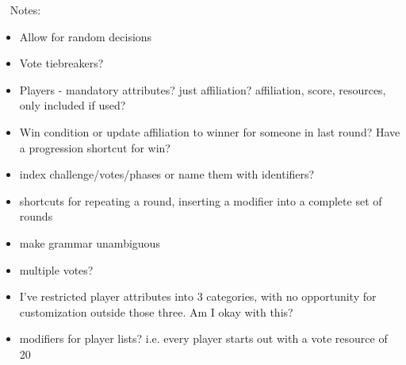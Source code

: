 \documentclass{article}
\begin{document}
~\newline
Notes:
\begin{itemize}
	\item Allow for random decisions
	\item Vote tiebreakers?
	\item Players - mandatory attributes? just affiliation? affiliation, score, 
	resources, only included if used?
	\item Win condition or update affiliation to winner for someone in last 
	round? Have a progression shortcut for win?
	\item index challenge/votes/phases or name them with identifiers?
	\item shortcuts for repeating a round, inserting a modifier into a complete 
	set of rounds
	\item make grammar unambiguous
	\item multiple votes? 
	\item I've restricted player attributes into 3 categories, with no 
	opportunity for customization outside those three. Am I okay with this?
	\item modifiers for player lists? i.e. every player starts out with a vote 
	resource of 20
\end{itemize}
\end{document}
